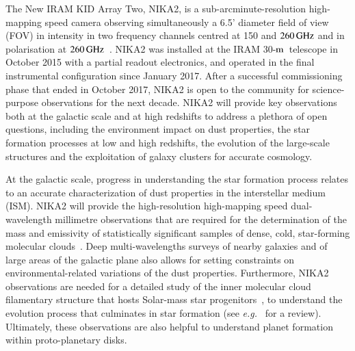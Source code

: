 \documentclass[traditionalabstract]{aa}
\newcommand{\trentemetre}{30-$\rm{m}$}
\begin{document}
The New IRAM KID Array Two, NIKA2, is a sub-arcminute-resolution
high-mapping speed camera observing simultaneously a 6.5' diameter
field of view (FOV) in intensity in two
frequency channels centred at 150 and $260\,\rm{GHz}$ and in
polarisation at $260\, \rm{GHz}$~\citep{Adam2018}. NIKA2 was installed
at the IRAM \trentemetre\ telescope in October 2015 with a partial readout
electronics, and operated in the final instrumental configuration since
January 2017. After a successful
commissioning phase that ended in October 2017, NIKA2 is
open to the community for science-purpose observations for the next
decade. NIKA2 will provide key observations both at the galactic scale
and at high redshifts to address a plethora of open questions, including
the environment impact on dust properties, the star formation processes
at low and high redshifts, the evolution of the large-scale structures
and the exploitation of galaxy clusters for accurate cosmology.
%

At the galactic scale, progress in understanding the star formation
process relates to an accurate characterization of dust properties in
the interstellar medium (ISM). NIKA2 will provide the high-resolution
high-mapping speed dual-wavelength millimetre observations that are
required for the determination of the mass and emissivity of
statistically significant samples of dense, cold, star-forming
molecular clouds~\citep{Rigby2018}.
Deep multi-wavelengths surveys of nearby galaxies and of large areas
of the galactic plane also allows for setting constraints on
environmental-related variations of the dust properties.
Furthermore, NIKA2 observations are needed for a
detailed study of the inner molecular cloud filamentary structure that
hosts Solar-mass star progenitors~\citep{Bracco2017}, to
understand the evolution process that culminates in star
formation (see \emph{e.g.}~\citet{Andre2014} for a review). Ultimately, these
observations are also helpful to understand planet formation within
proto-planetary disks.
\end{document}
